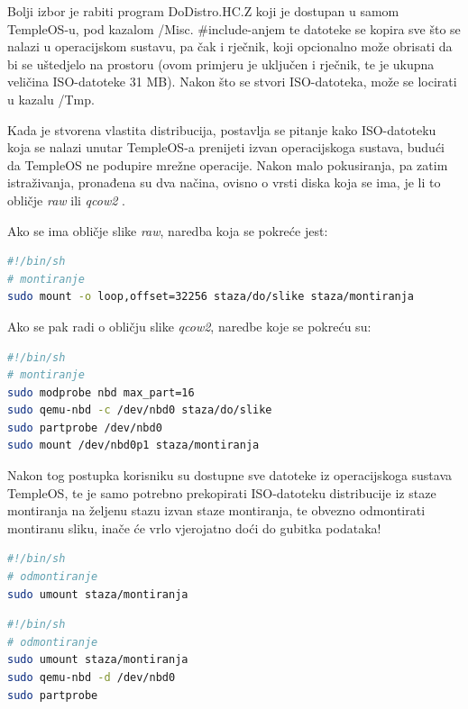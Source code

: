 \documentclass{foi}
\begin{document}
Bolji izbor je rabiti program {\selectfont DoDistro.HC.Z} koji je dostupan u samom TempleOS-u, pod kazalom {\selectfont /Misc}. {\selectfont \#include}-anjem te datoteke se kopira sve što se nalazi u operacijskom sustavu, pa čak i rječnik, koji opcionalno može obrisati da bi se uštedjelo na prostoru (ovom primjeru je uključen i rječnik, te je ukupna veličina ISO-datoteke 31 MB). Nakon što se stvori ISO-datoteka, može se locirati u kazalu {\selectfont /Tmp}.

Kada je stvorena vlastita distribucija, postavlja se pitanje kako ISO-datoteku koja se nalazi unutar TempleOS-a prenijeti izvan operacijskoga sustava, budući da TempleOS ne podupire mrežne operacije. Nakon malo pokusiranja, pa zatim istraživanja, pronađena su dva načina, ovisno o vrsti diska koja se ima, je li to obličje \emph{raw} ili \emph{qcow2} \cite{QEMUArchWiki}.

Ako se ima obličje slike \emph{raw}, naredba koja se pokreće jest:

\begin{lstlisting}[language=sh,caption={Montiranje obličja slike \emph{raw}},captionpos=b]
#!/bin/sh
# montiranje
sudo mount -o loop,offset=32256 staza/do/slike staza/montiranja
\end{lstlisting}

Ako se pak radi o obličju slike \emph{qcow2}, naredbe koje se pokreću su:

\begin{lstlisting}[language=sh,caption={Montiranje obličja slike \emph{qcow2}},captionpos=b]
#!/bin/sh
# montiranje
sudo modprobe nbd max_part=16
sudo qemu-nbd -c /dev/nbd0 staza/do/slike
sudo partprobe /dev/nbd0
sudo mount /dev/nbd0p1 staza/montiranja
\end{lstlisting}

Nakon tog postupka korisniku su dostupne sve datoteke iz operacijskoga sustava TempleOS, te je samo potrebno prekopirati ISO-datoteku distribucije iz staze montiranja na željenu stazu izvan staze montiranja, te obvezno odmontirati montiranu sliku, inače će vrlo vjerojatno doći do gubitka podataka!

\begin{lstlisting}[language=sh,caption={Odmontiranje obličja slike \emph{raw}},captionpos=b]
#!/bin/sh
# odmontiranje
sudo umount staza/montiranja
\end{lstlisting}

\begin{lstlisting}[language=sh,caption={Odmontiranje obličja slike \emph{qcow2}},captionpos=b]
#!/bin/sh
# odmontiranje
sudo umount staza/montiranja
sudo qemu-nbd -d /dev/nbd0
sudo partprobe
\end{lstlisting}
\end{document}
